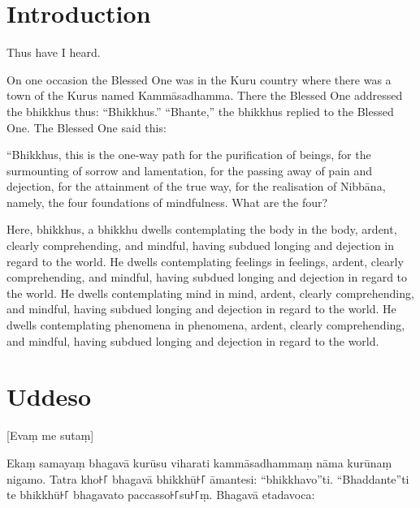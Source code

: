 \newcommand\englishPage{%
  \clearpage%
  \englishText%
}

\newcommand\paliPage{%
  \clearpage%
  \paliText%
}

\renewcommand{\englishTitle}{The Foundations of Mindfulness}
\renewcommand{\paliTitle}{Mahāsatipaṭṭhāna Sutta}

\englishPage
\chapter{Introduction}

Thus have I heard.

On one occasion the Blessed One was in the Kuru country where there was a town
of the Kurus named Kammāsadhamma. There the Blessed One addressed the bhikkhus
thus: “Bhikkhus.” “Bhante,” the bhikkhus replied to the Blessed One. The Blessed
One said this:

“Bhikkhus, this is the one-way path for the purification of beings, for the
surmounting of sorrow and lamentation, for the passing away of pain and
dejection, for the attainment of the true way, for the realisation of Nibbāna,
namely, the four foundations of mindfulness. What are the four?

Here, bhikkhus, a bhikkhu dwells contemplating the body in the body, ardent,
clearly comprehending, and mindful, having subdued longing and dejection in
regard to the world. He dwells contemplating feelings in feelings, ardent,
clearly comprehending, and mindful, having subdued longing and dejection in
regard to the world. He dwells contemplating mind in mind, ardent, clearly
comprehending, and mindful, having subdued longing and dejection in regard to
the world. He dwells contemplating phenomena in phenomena, ardent, clearly
comprehending, and mindful, having subdued longing and dejection in regard to
the world.


\paliPage
\chapter*{Uddeso}

[Evaṃ me sutaṃ]

Ekaṃ samayaṃ bhagavā kurūsu viharati kammāsadhammaṃ nāma kurūnaṃ nigamo. Tatra
kho꜔꜒ bhagavā bhikkhū꜔꜒ āmantesi: “bhikkhavo”ti. “Bhaddante”ti te bhikkhū꜔꜒ bhagavato
paccasso꜔꜒su꜔꜒ṃ. Bhagavā etadavoca:

